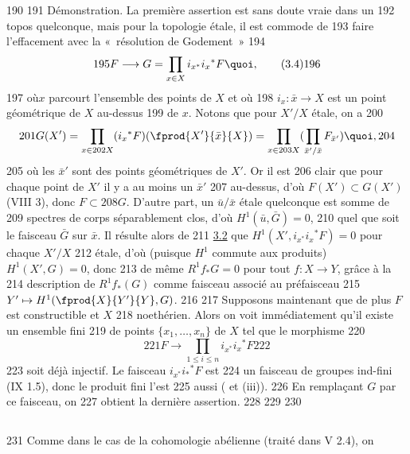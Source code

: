   190	
   191	Démonstration. La première assertion est sans doute vraie dans un
   192	topos quelconque, mais pour la topologie étale, il est commode de
   193	faire l'effacement avec la « résolution de Godement » 
   194	\begin{equation*}
   195	F\longrightarrow G=\prod_{x\in X}i_{x^{\ast}}i_{x}{}^{\ast}F{\quoi},\tag{3.4}
   196	\end{equation*}
   197	où\pageoriginale $x$ parcourt l'ensemble des points de $X$ et où
   198	$i_{x}:\bar{x}\rightarrow X$ est un point géométrique de $X$ au-dessus
   199	de $x$. Notons que pour $X'/X$ étale, on a
   200	$$
   201	G(X')=\prod_{x\in
   202	  X}(i_{x}{}^{\ast}F)(\fprod{X'}{\bar{x}}{X})=\prod_{x\in
   203	  X}(\prod_{\bar{x}' /\bar{x}}F_{\bar{x}'}){\quoi},
   204	$$
   205	où les $\bar{x}'$ sont des points géométriques de $X'$. Or il est
   206	clair que pour chaque point de $X'$ il y a au moins un $\bar{x}'$
   207	au-dessus, d'où $F(X')\subset G(X')$ (VIII 3), donc $F\subset
   208	G$. D'autre part, un $\bar{u}/\bar{x}$ étale quelconque est somme de
   209	spectres de corps séparablement clos, d'où $H^1(\bar{u},\bar{G})=0$,
   210	quel que soit le faisceau $\bar{G}$ sur $\bar{x}$. Il résulte alors de
   211	\hyperref[XII.prop3.2]{3.2} que $H^1(X', i_{x^{\ast}}i_x{}^{\ast}F)=0$ pour chaque $X'/X$
   212	étale, d'où (puisque $H^1$ commute aux produits) $H^1(X',G)=0$, donc
   213	de même $R^1f_{\ast}G=0$ pour tout $f:X\rightarrow Y$, grâce à la
   214	description de $R^1f_{\ast}(G)$ comme faisceau associé au préfaisceau
   215	$Y'\mapsto H^1(\fprod{X}{Y'}{Y},G)$.
   216	
   217	Supposons maintenant que de plus $F$ est constructible et $X$
   218	noethérien. Alors on voit immédiatement qu'il existe un ensemble fini
   219	de points $\{x_1,\ldots,x_n\}$ de $X$ tel que le morphisme
   220	$$
   221	F\longrightarrow \prod_{1\leq i\leq n}i_{x^{\ast}}i_{x}{}^{\ast}F
   222	$$
   223	soit déjà injectif. Le faisceau $i_{x^{\ast}}i_{\ast}{}^{\ast}F$ est
   224	un faisceau de groupes ind-fini (IX 1.5), donc le produit fini l'est
   225	aussi ( et  (iii)). 
   226	En remplaçant $G$ par ce faisceau, on
   227	obtient la dernière assertion.
   228	
   229	\setcounter{subsection}{4}
   230	\subsection{}
   231	Comme dans le cas de la cohomologie abélienne (traité dans V 2.4), on
